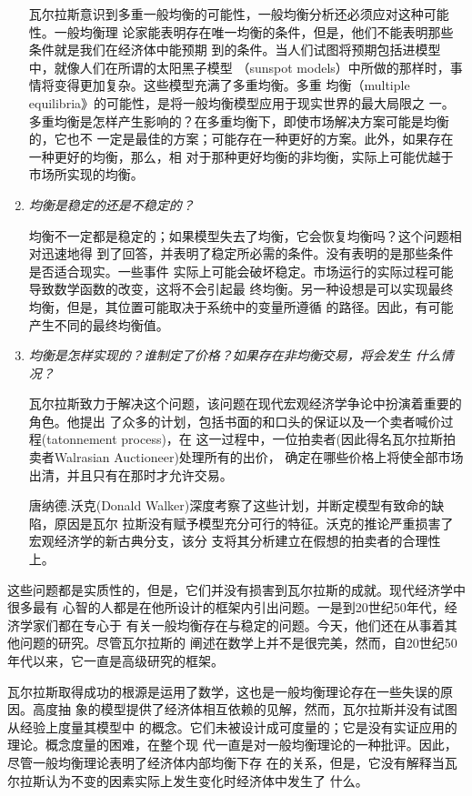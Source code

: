 \begin{enumerate}
瓦尔拉斯意识到多重一般均衡的可能性，一般均衡分析还必须应对这种可能性。一般均衡理
论家能表明存在唯一均衡的条件，但是，他们不能表明那些条件就是我们在经济体中能预期
到的条件。当人们试图将预期包括进模型中，就像人们在所谓的太阳黑子模型
（sunspot models）中所做的那样时，事情将变得更加复杂。这些模型充满了多重均衡。多重
均衡（multiple equilibria》的可能性，是将一般均衡模型应用于现实世界的最大局限之
一。多重均衡是怎样产生影响的？在多重均衡下，即使市场解决方案可能是均衡的，它也不
一定是最佳的方案；可能存在一种更好的方案。此外，如果存在一种更好的均衡，那么，相
对于那种更好均衡的非均衡，实际上可能优越于市场所实现的均衡。

\item \textit{均衡是稳定的还是不稳定的？}

  均衡不一定都是稳定的；如果模型失去了均衡，它会恢复均衡吗？这个问题相对迅速地得
  到了回答，并表明了稳定所必需的条件。没有表明的是那些条件是否适合现实。一些事件
  实际上可能会破坏稳定。市场运行的实际过程可能导致数学函数的改变，这将不会引起最
  终均衡。另一种设想是可以实现最终均衡，但是，其位置可能取决于系统中的变量所遵循
  的路径。因此，有可能产生不同的最终均衡值。

\item \textit{均衡是怎样实现的？谁制定了价格？如果存在非均衡交易，将会发生
什么情况？}

瓦尔拉斯致力于解决这个问题，该问题在现代宏观经济学争论中扮演着重要的角色。他提出
了众多的计划，包括书面的和口头的保证以及一个卖者喊价过程(tatonnement process)，在
这一过程中，一位拍卖者(因此得名瓦尔拉斯拍卖者Walrasian Auctioneer)处理所有的出价，
确定在哪些价格上将使全部市场出清，并且只有在那时才允许交易。

唐纳德.沃克(Donald Walker)深度考察了这些计划，并断定模型有致命的缺陷，原因是瓦尔
拉斯没有赋予模型充分可行的特征。沃克的推论严重损害了宏观经济学的新古典分支，该分
支将其分析建立在假想的拍卖者的合理性上。

\end{enumerate}

这些问题都是实质性的，但是，它们并没有损害到瓦尔拉斯的成就。现代经济学中很多最有
心智的人都是在他所设计的框架内引出问题。一是到20世纪50年代，经济学家们都在专心于
有关一般均衡存在与稳定的问题。今天，他们还在从事着其他问题的研究。尽管瓦尔拉斯的
阐述在数学上并不是很完美，然而，自20世纪50年代以来，它一直是高级研究的框架。

瓦尔拉斯取得成功的根源是运用了数学，这也是一般均衡理论存在一些失误的原因。高度抽
象的模型提供了经济体相互依赖的见解，然而，瓦尔拉斯并没有试图从经验上度量其模型中
的概念。它们未被设计成可度量的；它是没有实证应用的理论。概念度量的困难，在整个现
代一直是对一般均衡理论的一种批评。因此，尽管一般均衡理论表明了经济体内部均衡下存
在的关系，但是，它没有解释当瓦尔拉斯认为不变的因素实际上发生变化时经济体中发生了
什么。

